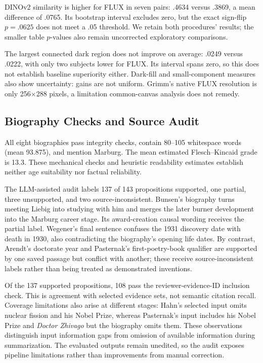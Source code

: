 \documentclass[11pt]{article}
\begin{document}
DINOv2 similarity is higher for FLUX in seven pairs: .4634 versus .3869, a mean difference of .0765. Its bootstrap interval excludes zero, but the exact sign-flip $p=.0625$ does not meet a .05 threshold. We retain both procedures' results; the smaller table $p$-values also remain uncorrected exploratory comparisons.

The largest connected dark region does not improve on average: .0249 versus .0222, with only two subjects lower for FLUX. Its interval spans zero, so this does not establish baseline superiority either. Dark-fill and small-component measures also show uncertainty: gains are not uniform. Grimm's native FLUX resolution is only 256$\times$288 pixels, a limitation common-canvas analysis does not remedy.

\subsection{Biography Checks and Source Audit}

All eight biographies pass integrity checks, contain 80--105 whitespace words (mean 93.875), and mention Marburg. The mean estimated Flesch--Kincaid grade is 13.3. These mechanical checks and heuristic readability estimates establish neither age suitability nor factual reliability.

The LLM-assisted audit labels 137 of 143 propositions supported, one partial, three unsupported, and two source-inconsistent. Bunsen's biography turns meeting Liebig into studying with him and merges the later burner development into the Marburg career stage. Its award-creation causal wording receives the partial label. Wegener's final sentence confuses the 1931 discovery date with death in 1930, also contradicting the biography's opening life dates. By contrast, Arendt's doctorate year and Pasternak's first-poetry-book qualifier are supported by one saved passage but conflict with another; these receive source-inconsistent labels rather than being treated as demonstrated inventions.

Of the 137 supported propositions, 108 pass the reviewer-evidence-ID inclusion check. This is agreement with selected evidence sets, not semantic citation recall. Coverage limitations also arise at different stages: Hahn's selected input omits nuclear fission and his Nobel Prize, whereas Pasternak's input includes his Nobel Prize and \emph{Doctor Zhivago} but the biography omits them. These observations distinguish input information gaps from omission of available information during summarization. The evaluated outputs remain unedited, so the audit exposes pipeline limitations rather than improvements from manual correction.
\end{document}

